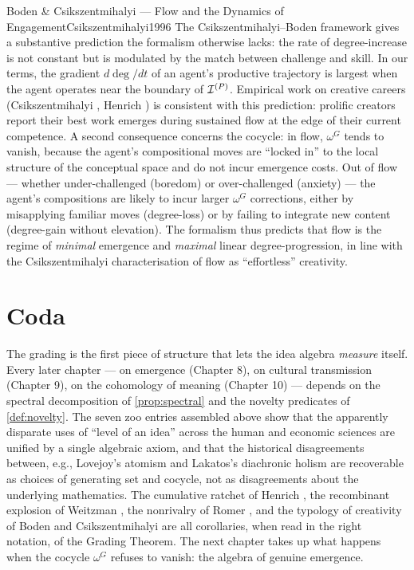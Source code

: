 \begin{zooentry}{Boden \& Csikszentmihalyi --- Flow and the Dynamics of Engagement}{Csikszentmihalyi1996}
\litcomment The Csikszentmihalyi--Boden framework gives a substantive
prediction the formalism otherwise lacks: the rate of degree-increase
is not constant but is modulated by the match between challenge and
skill. In our terms, the gradient $d\deg/dt$ of an agent's productive
trajectory is largest when the agent operates near the boundary of
$\mathcal{I}^{(P)}$. Empirical work on creative careers (Csikszentmihalyi
\cite{Csikszentmihalyi1996}, Henrich \cite{Henrich2015}) is consistent
with this prediction: prolific creators report their best work emerges
during sustained flow at the edge of their current competence.
A second consequence concerns the cocycle: in flow, $\omega^G$ tends
to vanish, because the agent's compositional moves are ``locked in''
to the local structure of the conceptual space and do not incur
emergence costs. Out of flow --- whether under-challenged (boredom)
or over-challenged (anxiety) --- the agent's compositions are likely
to incur larger $\omega^G$ corrections, either by misapplying
familiar moves (degree-loss) or by failing to integrate new content
(degree-gain without elevation). The formalism thus predicts that
flow is the regime of \emph{minimal} emergence and \emph{maximal}
linear degree-progression, in line with the Csikszentmihalyi
characterisation of flow as ``effortless'' creativity.
\end{zooentry}

\section*{Coda}\label{sec:grading-coda}

The grading is the first piece of structure that lets the idea algebra
\emph{measure} itself. Every later chapter --- on emergence (Chapter 8),
on cultural transmission (Chapter 9), on the cohomology of meaning
(Chapter 10) --- depends on the spectral decomposition of
\cref{prop:spectral} and the novelty predicates of \cref{def:novelty}.
The seven zoo entries assembled above show that the apparently
disparate uses of ``level of an idea'' across the human and economic
sciences are unified by a single algebraic axiom, and that the
historical disagreements between, e.g., Lovejoy's atomism
\cite{Lovejoy1936} and Lakatos's diachronic holism \cite{Lakatos1970}
are recoverable as choices of generating set and cocycle, not as
disagreements about the underlying mathematics. The cumulative
ratchet of Henrich \cite{Henrich2015}, the recombinant explosion of
Weitzman \cite{Weitzman1998}, the nonrivalry of Romer
\cite{Romer1990}, and the typology of creativity of Boden
\cite{Boden2004} and Csikszentmihalyi \cite{Csikszentmihalyi1996} are
all corollaries, when read in the right notation, of the Grading
Theorem. The next chapter takes up what happens when the cocycle
$\omega^G$ refuses to vanish: the algebra of genuine emergence.


